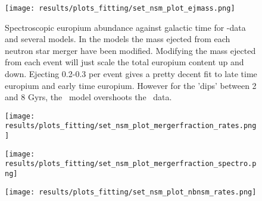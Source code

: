 \begin{figure}[h]
  \begin{minipage}[t][][t]{0.49\textwidth}
    \centering
    \texttt{[image: results/plots\_fitting/set\_nsm\_plot\_ejmass.png]}
    \caption[\todo NSM-ejectamass]{
      \label{fig:fit-v3-ejecta}
      Spectroscopic europium abundance against galactic time for \eris-data and several \omegamodel models. In the models the mass ejected from each neutron star merger have been modified.
      Modifying the mass ejected from each event will just scale the total europium content up and down.
      Ejecting 0.2-0.3 \msol per event gives a pretty decent fit to late time europium and early time europium.
      However for the 'dips' between 2 and 8 Gyrs, the \omegamodel\ model overshoots the \eris\ data.
    }
    \texttt{[image: results/plots\_fitting/set\_nsm\_plot\_mergerfraction\_rates.png]}
    \caption[\todo NSM fmerger rate]]{
      \label{fig:fit-v3-mergerfrac-nsmr}
    }
  \end{minipage}
  \begin{minipage}[t][][t]{0.49\textwidth}
    \centering
    \texttt{[image: results/plots\_fitting/set\_nsm\_plot\_mergerfraction\_spectro.png]}
    \caption[\todo mergerfraction spectroscopic plot]{
      \label{fig:fit-v3-mergerfrac-euro}
    }
    \texttt{[image: results/plots\_fitting/set\_nsm\_plot\_nbnsm\_rates.png]}
    \caption[\todo nbnsm rates plot]{
        \label{fig:fit-v3-number-nsmr}
      }
  \end{minipage}
\end{figure}
